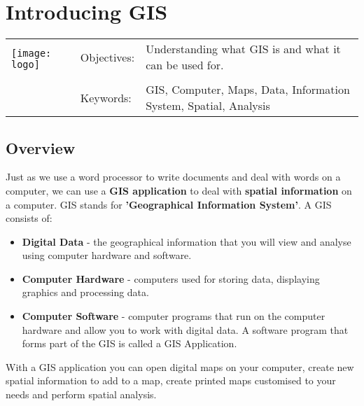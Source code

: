 
\setcounter{page}{1}
\setcounter{secnumdepth}{1} 



\section{Introducing GIS}\label{gis_intro}
\begin{tabular}{p{3.5cm}p{6cm}p{6cm}}
\multirow{2}{*}{\texttt{[image: logo]}} & Objectives: &
Understanding what GIS is and what it can be used for. \\ 
& & \\
& Keywords: & GIS, Computer, Maps, Data, Information System, Spatial,
Analysis \\
\hline
\end{tabular}

\subsection{Overview}\label{subsec:overview}

Just as we use a word processor to write documents and deal with words on a
computer, we can use a \textbf{GIS application} to deal with \textbf{spatial
information} on a computer. GIS stands for \textbf{'Geographical Information
System'}. A GIS consists of:

\begin{itemize}
\item \textbf{Digital Data} - the geographical information that you will view
and analyse using computer hardware and software.
\item \textbf{Computer Hardware} - computers used for storing data,
displaying graphics and processing data.
\item \textbf{Computer Software} - computer programs that run on the computer
hardware and allow you to work with digital data. A software program that
forms part of the GIS is called a GIS Application.
\end{itemize}

With a GIS application you can open digital maps on your computer, create new
spatial information to add to a map, create printed maps customised to your
needs and perform spatial analysis.

